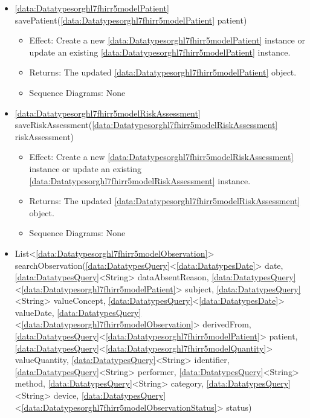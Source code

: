 \begin{description}
\begin{itemize}[noitemsep,nolistsep,leftmargin=-.25cm]
\begin{itemize}[noitemsep,nolistsep]
           \item Returns: The \ref{data:Datatypesorghl7fhirr5modelObservation} object.
           \item Sequence Diagrams: \cref{diag:Interaction:Incomingsensordata}
        \end{itemize}
      \item \textsf{\ref{data:Datatypesorghl7fhirr5modelPatient} savePatient(\ref{data:Datatypesorghl7fhirr5modelPatient} patient)}
        \begin{itemize}[noitemsep,nolistsep]
           \item Effect: Create a new \ref{data:Datatypesorghl7fhirr5modelPatient} instance or update an existing \ref{data:Datatypesorghl7fhirr5modelPatient} instance. 
           \item Returns: The updated \ref{data:Datatypesorghl7fhirr5modelPatient} object.
           \item Sequence Diagrams: None
        \end{itemize}
      \item \textsf{\ref{data:Datatypesorghl7fhirr5modelRiskAssessment} saveRiskAssessment(\ref{data:Datatypesorghl7fhirr5modelRiskAssessment} riskAssessment)}
        \begin{itemize}[noitemsep,nolistsep]
           \item Effect: Create a new \ref{data:Datatypesorghl7fhirr5modelRiskAssessment} instance or update an existing \ref{data:Datatypesorghl7fhirr5modelRiskAssessment} instance. 
           \item Returns: The updated \ref{data:Datatypesorghl7fhirr5modelRiskAssessment} object.
           \item Sequence Diagrams: None
        \end{itemize}
      \item \textsf{List\textless{}\ref{data:Datatypesorghl7fhirr5modelObservation}\textgreater{} searchObservation(\ref{data:DatatypesQuery}\textless{}\ref{data:DatatypesDate}\textgreater{} date, \ref{data:DatatypesQuery}\textless{}String\textgreater{} dataAbsentReason, \ref{data:DatatypesQuery}\textless{}\ref{data:Datatypesorghl7fhirr5modelPatient}\textgreater{} subject, \ref{data:DatatypesQuery}\textless{}String\textgreater{} valueConcept, \ref{data:DatatypesQuery}\textless{}\ref{data:DatatypesDate}\textgreater{} valueDate, \ref{data:DatatypesQuery}\textless{}\ref{data:Datatypesorghl7fhirr5modelObservation}\textgreater{} derivedFrom, \ref{data:DatatypesQuery}\textless{}\ref{data:Datatypesorghl7fhirr5modelPatient}\textgreater{} patient, \ref{data:DatatypesQuery}\textless{}\ref{data:Datatypesorghl7fhirr5modelQuantity}\textgreater{} valueQuantity, \ref{data:DatatypesQuery}\textless{}String\textgreater{} identifier, \ref{data:DatatypesQuery}\textless{}String\textgreater{} performer, \ref{data:DatatypesQuery}\textless{}String\textgreater{} method, \ref{data:DatatypesQuery}\textless{}String\textgreater{} category, \ref{data:DatatypesQuery}\textless{}String\textgreater{} device, \ref{data:DatatypesQuery}\textless{}\ref{data:Datatypesorghl7fhirr5modelObservationStatus}\textgreater{} status)}

\end{itemize}
\end{description}
